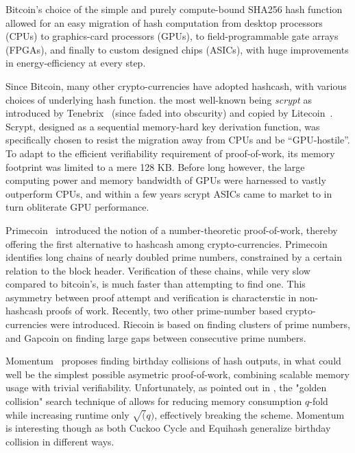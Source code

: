 \documentclass[11pt, oneside]{article}
\begin{document}
Bitcoin's choice of the simple and purely compute-bound SHA256 hash function
allowed for an easy migration of hash computation from 
desktop processors (CPUs) to graphics-card processors (GPUs),
to field-programmable gate arrays (FPGAs), and finally to custom designed
chips (ASICs), with huge improvements in energy-efficiency at every step.

Since Bitcoin, many other crypto-currencies have adopted hashcash, with various
choices of underlying hash function. the most well-known being {\em scrypt} as
introduced by Tenebrix~\cite{tenebrix2011} (since faded into obscurity)
and copied by Litecoin~\cite{litecoin2011}.
Scrypt, designed as a sequential memory-hard key derivation function,
was specifically chosen to resist the migration away from CPUs and be ``GPU-hostile''.
To adapt to the efficient verifiability requirement of proof-of-work, its
memory footprint was limited to a mere 128 KB. Before long however, the large computing power
and memory bandwidth of GPUs were harnessed to vastly outperform CPUs, and within a few years
scrypt ASICs came to market to in turn obliterate GPU performance.

Primecoin~\cite{king2013} introduced the notion of a number-theoretic proof-of-work,
thereby offering the first alternative to hashcash among crypto-currencies.
Primecoin identifies long chains of nearly doubled prime numbers, constrained
by a certain relation to the block header.
Verification of these chains, while very slow compared to bitcoin's, is much faster
than attempting to find one.
This asymmetry between proof attempt and verification is characterstic in non-hashcash proofs of work.
Recently, two other prime-number based crypto-currencies were introduced. Riecoin is based
on finding clusters of prime numbers, and Gapcoin on finding large gaps between consecutive prime numbers.

Momentum~\cite{larimer2013} proposes finding birthday collisions of hash outputs,
in what could well be the simplest possible asymetric proof-of-work,
combining scalable memory usage with trivial verifiability.
Unfortunately, as pointed out in \cite{equihash16}, the "golden collision" search technique of \cite{parallel99}
allows for reducing memory consumption $q$-fold while increasing runtime only $\sqrt(q)$, effectively breaking the scheme.
Momentum is interesting though as both Cuckoo Cycle and Equihash generalize birthday collision in different ways.
\end{document}
